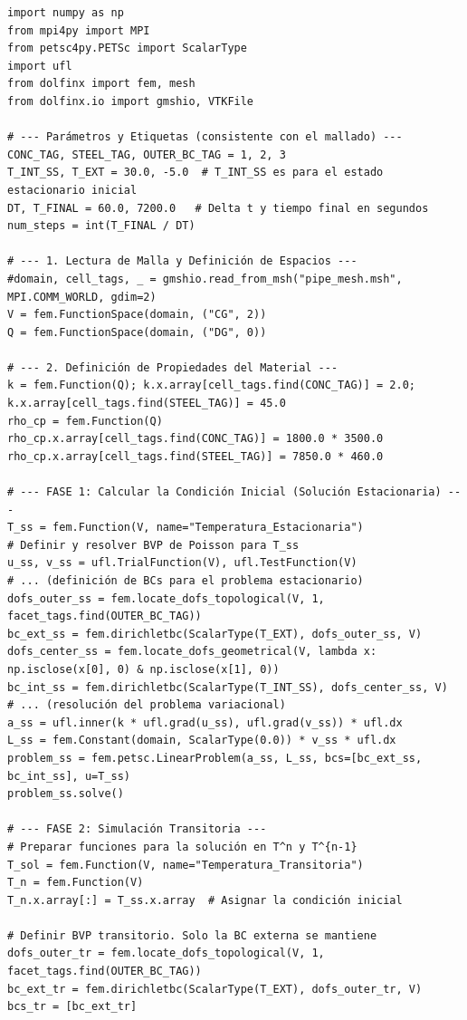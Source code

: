 \begin{codelisting}[h!]
\begin{verbatim}
import numpy as np
from mpi4py import MPI
from petsc4py.PETSc import ScalarType
import ufl
from dolfinx import fem, mesh
from dolfinx.io import gmshio, VTKFile

# --- Parámetros y Etiquetas (consistente con el mallado) ---
CONC_TAG, STEEL_TAG, OUTER_BC_TAG = 1, 2, 3
T_INT_SS, T_EXT = 30.0, -5.0  # T_INT_SS es para el estado estacionario inicial
DT, T_FINAL = 60.0, 7200.0   # Delta t y tiempo final en segundos
num_steps = int(T_FINAL / DT)

# --- 1. Lectura de Malla y Definición de Espacios ---
#domain, cell_tags, _ = gmshio.read_from_msh("pipe_mesh.msh", MPI.COMM_WORLD, gdim=2)
V = fem.FunctionSpace(domain, ("CG", 2))
Q = fem.FunctionSpace(domain, ("DG", 0))

# --- 2. Definición de Propiedades del Material ---
k = fem.Function(Q); k.x.array[cell_tags.find(CONC_TAG)] = 2.0; k.x.array[cell_tags.find(STEEL_TAG)] = 45.0
rho_cp = fem.Function(Q)
rho_cp.x.array[cell_tags.find(CONC_TAG)] = 1800.0 * 3500.0
rho_cp.x.array[cell_tags.find(STEEL_TAG)] = 7850.0 * 460.0

# --- FASE 1: Calcular la Condición Inicial (Solución Estacionaria) ---
T_ss = fem.Function(V, name="Temperatura_Estacionaria")
# Definir y resolver BVP de Poisson para T_ss
u_ss, v_ss = ufl.TrialFunction(V), ufl.TestFunction(V)
# ... (definición de BCs para el problema estacionario)
dofs_outer_ss = fem.locate_dofs_topological(V, 1, facet_tags.find(OUTER_BC_TAG))
bc_ext_ss = fem.dirichletbc(ScalarType(T_EXT), dofs_outer_ss, V)
dofs_center_ss = fem.locate_dofs_geometrical(V, lambda x: np.isclose(x[0], 0) & np.isclose(x[1], 0))
bc_int_ss = fem.dirichletbc(ScalarType(T_INT_SS), dofs_center_ss, V)
# ... (resolución del problema variacional)
a_ss = ufl.inner(k * ufl.grad(u_ss), ufl.grad(v_ss)) * ufl.dx
L_ss = fem.Constant(domain, ScalarType(0.0)) * v_ss * ufl.dx
problem_ss = fem.petsc.LinearProblem(a_ss, L_ss, bcs=[bc_ext_ss, bc_int_ss], u=T_ss)
problem_ss.solve()

# --- FASE 2: Simulación Transitoria ---
# Preparar funciones para la solución en T^n y T^{n-1}
T_sol = fem.Function(V, name="Temperatura_Transitoria")
T_n = fem.Function(V)
T_n.x.array[:] = T_ss.x.array  # Asignar la condición inicial

# Definir BVP transitorio. Solo la BC externa se mantiene
dofs_outer_tr = fem.locate_dofs_topological(V, 1, facet_tags.find(OUTER_BC_TAG))
bc_ext_tr = fem.dirichletbc(ScalarType(T_EXT), dofs_outer_tr, V)
bcs_tr = [bc_ext_tr]


\end{verbatim}
\end{codelisting}
